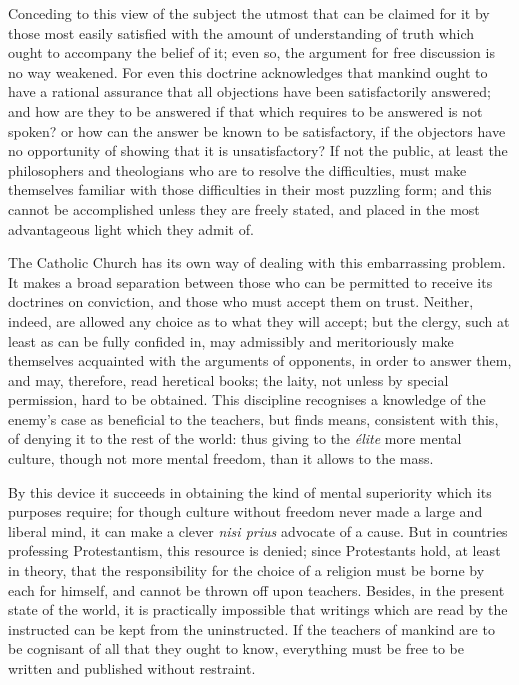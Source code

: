 Conceding to this view of the subject the utmost that can be claimed for it by those most easily satisfied with the amount of understanding of truth which ought to accompany the belief of it; even so, the argument for free discussion is no way weakened. For even this doctrine acknowledges that mankind ought to have a rational assurance that all objections have been satisfactorily answered; and how are they to be answered if that which requires to be answered is not spoken? or how can the answer be known to be satisfactory, if the objectors have no opportunity of showing that it is unsatisfactory? If not the public, at least the philosophers and theologians who are to resolve the difficulties, must make themselves familiar with those difficulties in their most puzzling form; and this cannot be accomplished unless they are freely stated, and placed in the most advantageous light which they admit of.\par

The Catholic Church has its own way of dealing with this embarrassing problem. It makes a broad separation between those who can be permitted to receive its doctrines on conviction, and those who must accept them on trust. Neither, indeed, are allowed any choice as to what they will accept; but the clergy, such at least as can be fully confided in, may admissibly and meritoriously make themselves acquainted with the arguments of opponents, in order to answer them, and may, therefore, read heretical books; the laity, not unless by special permission, hard to be obtained. This discipline recognises a knowledge of the enemy’s case as beneficial to the teachers, but finds means, consistent with this, of denying it to the rest of the world: thus giving to the \textit{élite} more mental culture, though not more mental freedom, than it allows to the mass.\par

By this device it succeeds in obtaining the kind of mental superiority which its purposes require; for though culture without freedom never made a large and liberal mind, it can make a clever \textit{nisi prius} advocate of a cause. But in countries professing Protestantism, this resource is denied; since Protestants hold, at least in theory, that the responsibility for the choice of a religion must be borne by each for himself, and cannot be thrown off upon teachers. Besides, in the present state of the world, it is practically impossible that writings which are read by the instructed can be kept from the uninstructed. If the teachers of mankind are to be cognisant of all that they ought to know, everything must be free to be written and published without restraint.\par

